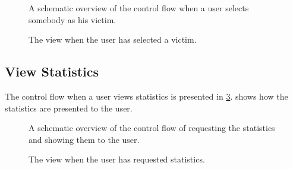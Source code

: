 			\begin{figure}
				\caption{A schematic overview of the control flow when a user selects somebody as his victim.}
				\label{fig:1:controlflowVictim}
			\end{figure}	

			\begin{figure}
					\caption{The view when the user has selected a victim.}
					\label{fig:1:viewVictim:selectedVictim}
			\end{figure}	

	\subsection{View Statistics}
		The control flow when a user views statistics is presented in \cref{fig:1:controlflowStat}.  shows how the statistics are presented to the user.


		\begin{figure}
			\caption{A schematic overview of the control flow of requesting the statistics and showing them to the user.}
			\label{fig:1:controlflowStat}
		\end{figure}

		\begin{figure}
			\caption{The view when the user has requested statistics.}
			\label{fig:1:viewStat}
		\end{figure}